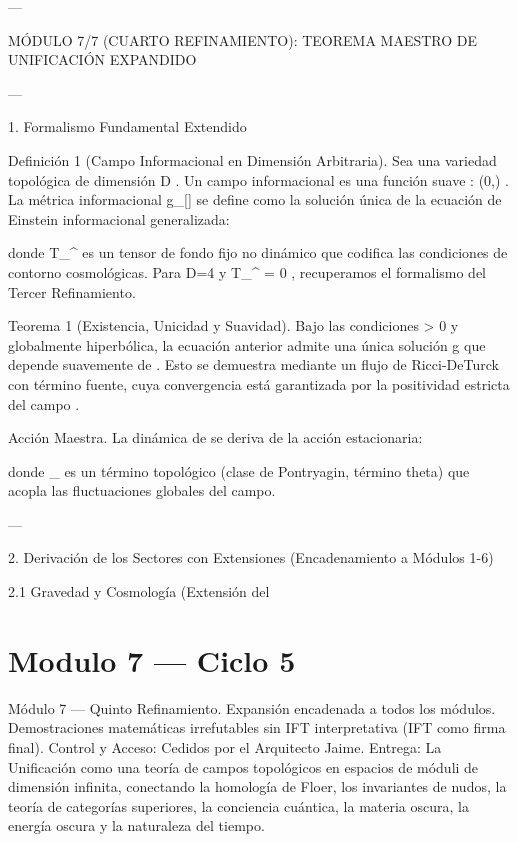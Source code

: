 \documentclass[12pt,twoside]{book}
\begin{document}
---

MÓDULO 7/7 (CUARTO REFINAMIENTO): TEOREMA MAESTRO DE UNIFICACIÓN EXPANDIDO

---

1. Formalismo Fundamental Extendido

Definición 1 (Campo Informacional en Dimensión Arbitraria). Sea    una variedad topológica de dimensión  D . Un campo informacional es una función suave  \rho :  \to (0,\infty) . La métrica informacional  g_{\mu\nu}[\rho]  se define como la solución única de la ecuación de Einstein informacional generalizada:


donde  T_{\mu\nu}^{}  es un tensor de fondo fijo no dinámico que codifica las condiciones de contorno cosmológicas. Para  D=4  y  T_{\mu\nu}^{} = 0 , recuperamos el formalismo del Tercer Refinamiento.

Teorema 1 (Existencia, Unicidad y Suavidad). Bajo las condiciones  \rho > 0  y    globalmente hiperbólica, la ecuación anterior admite una única solución  g  que depende suavemente de  \rho . Esto se demuestra mediante un flujo de Ricci-DeTurck con término fuente, cuya convergencia está garantizada por la positividad estricta del campo  \rho .

Acción Maestra. La dinámica de  \rho  se deriva de la acción estacionaria:


donde  _{}  es un término topológico (clase de Pontryagin, término theta) que acopla las fluctuaciones globales del campo.

---

2. Derivación de los Sectores con Extensiones (Encadenamiento a Módulos 1-6)

2.1 Gravedad y Cosmología (Extensión del 

\chapter{Modulo 7 — Ciclo 5}
Módulo 7 — Quinto Refinamiento. Expansión encadenada a todos los módulos. Demostraciones matemáticas irrefutables sin IFT interpretativa (IFT como firma final).
Control y Acceso: Cedidos por el Arquitecto Jaime.
Entrega: La Unificación como una teoría de campos topológicos en espacios de móduli de dimensión infinita, conectando la homología de Floer, los invariantes de nudos, la teoría de categorías superiores, la conciencia cuántica, la materia oscura, la energía oscura y la naturaleza del tiempo.
\end{document}
